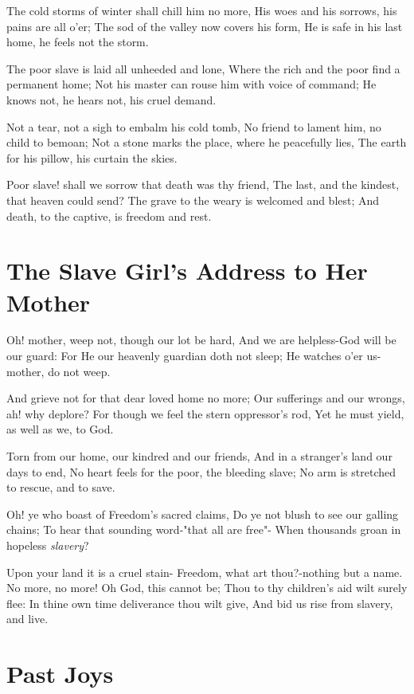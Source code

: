 \documentclass[11pt,a4paper]{article}
\begin{document}
The cold storms of winter shall chill him no more,
His woes and his sorrows, his pains are all o'er;
The sod of the valley now covers his form,
He is safe in his last home, he feels not the storm.

The poor slave is laid all unheeded and lone,
Where the rich and the poor find a permanent home;
Not his master can rouse him with voice of command;
He knows not, he hears not, his cruel demand.

Not a tear, not a sigh to embalm his cold tomb,
No friend to lament him, no child to bemoan;
Not a stone marks the place, where he peacefully lies,
The earth for his pillow, his curtain the skies.

Poor slave! shall we sorrow that death was thy friend,
The last, and the kindest, that heaven could send?
The grave to the weary is welcomed and blest;
And death, to the captive, is freedom and rest.

\section{The Slave Girl's Address to Her Mother}

Oh! mother, weep not, though our lot be hard,
And we are helpless-God will be our guard:
For He our heavenly guardian doth not sleep;
He watches o'er us-mother, do not weep.

And grieve not for that dear loved home no more;
Our sufferings and our wrongs, ah! why deplore?
For though we feel the stern oppressor's rod,
Yet he must yield, as well as we, to God.

Torn from our home, our kindred and our friends,
And in a stranger's land our days to end,
No heart feels for the poor, the bleeding slave;
No arm is stretched to rescue, and to save.

Oh! ye who boast of Freedom's sacred claims,
Do ye not blush to see our galling chains;
To hear that sounding word-"that all are free"-
When thousands groan in hopeless \textit{slavery}?

Upon your land it is a cruel stain-
Freedom, what art thou?-nothing but a name.
No more, no more! Oh God, this cannot be;
Thou to thy children's aid wilt surely flee:
In thine own time deliverance thou wilt give,
And bid us rise from slavery, and live.

\section{Past Joys}
\end{document}

